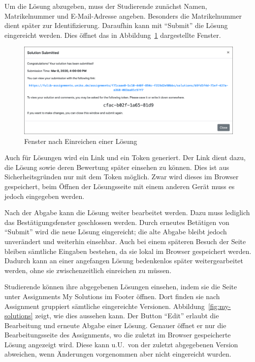 Um die Lösung abzugeben, muss der Studierende zunächst Namen, Matrikelnummer und E-Mail-Adresse angeben.
Besonders die Matrikelnummer dient später zur Identifizierung.
Daraufhin kann mit ``Submit'' die Lösung eingereicht werden.
Dies öffnet das in Abbildung~\ref{fig:solution-submitted} dargestellte Fenster.

\begin{figure}
    \centering
    \includegraphics[width=\textwidth]{chapter/fulib.org/img/solution-submitted.png}
    \caption{Fenster nach Einreichen einer Lösung}
    \label{fig:solution-submitted}
\end{figure}

Auch für Lösungen wird ein Link und ein Token generiert.
Der Link dient dazu, die Lösung sowie deren Bewertung später einsehen zu können.
Dies ist aus Sicherheitsgründen nur mit dem Token möglich.
Zwar wird dieses im Browser gespeichert, beim Öffnen der Lösungsseite mit einem anderen Gerät muss es jedoch eingegeben werden.

Nach der Abgabe kann die Lösung weiter bearbeitet werden.
Dazu muss lediglich das Bestätigungsfenster geschlossen werden.
Durch erneutes Betätigen von ``Submit'' wird die neue Lösung eingereicht;
die alte Abgabe bleibt jedoch unverändert und weiterhin einsehbar.
Auch bei einem späteren Besuch der Seite bleiben sämtliche Eingaben bestehen, da sie lokal im Browser gespeichert werden.
Dadurch kann an einer angefangen Lösung bedenkenlos später weitergearbeitet werden,
ohne sie zwischenzeitlich einreichen zu müssen.

Studierende können ihre abgegebenen Lösungen einsehen, indem sie die Seite unter Assignments \textrightarrow{} My Solutions im Footer öffnen.
Dort finden sie nach Assignment gruppiert sämtliche eingereichte Versionen.
Abbildung~\ref{fig:my-solutions} zeigt, wie dies aussehen kann.
Der Button ``Edit'' erlaubt die Bearbeitung und erneute Abgabe einer Lösung.
Genauer öffnet er nur die Bearbeitungsseite des Assignments,
wo die zuletzt im Browser gespeicherte Lösung angezeigt wird.
Diese kann u.U.\ von der zuletzt abgegebenen Version abweichen,
wenn Änderungen vorgenommen aber nicht eingereicht wurden.

